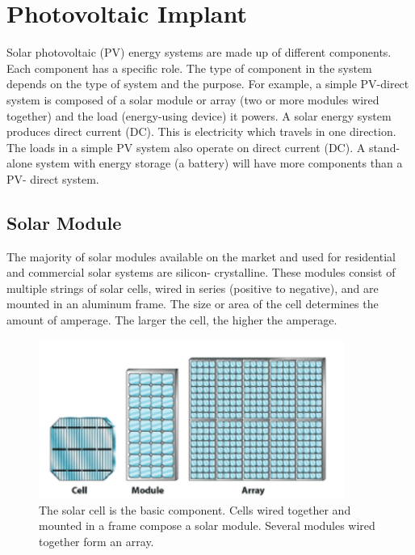 \section{Photovoltaic Implant}\label{sec:pv}

Solar photovoltaic (PV) energy systems are made up of
different components. Each component has a specific role.
The type of component in the system depends on the type
of system and the purpose. For example, a simple PV-direct
system is composed of a solar module or array (two or more
modules wired together) and the load (energy-using device)
it powers. A solar energy system produces
direct current (DC). This is electricity which travels in one
direction. The loads in a simple PV system also operate
on direct current (DC). A stand-alone system with energy
storage (a battery) will have more components than a PV-
direct system.

\subsection{Solar Module}
The majority of solar modules available on the market and
used for residential and commercial solar systems are silicon-
crystalline. These modules consist of multiple strings of solar
cells, wired in series (positive to negative), and are mounted
in an aluminum frame. The size or area of
the cell determines the amount of amperage. The larger the
cell, the higher the amperage.

\begin{figure}[H]
	\centering
	\includegraphics[width=10cm, keepaspectratio]{chapters/1_introduction/imgs/solarmodule.png}
	\caption{The solar cell is the basic component. Cells wired together
		and mounted in a frame compose a solar module. Several modules
		wired together form an array.}
	\label{fig:solmodule}
\end{figure}

